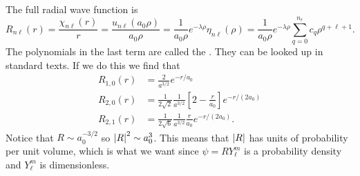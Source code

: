 The full radial wave function is
\[R_{n\ell}(r) = \frac{\chi_{n\ell}(r)}{r} = \frac{u_{n\ell}(a_0\rho)}{a_0\rho} = \frac{1}{a_0\rho}e^{-\lambda\rho}\eta_{n\ell}(\rho) = \frac{1}{a_0\rho}e^{-\lambda\rho}\sum_{q=0}^{n_r} c_q\rho^{q + \ell + 1}.\]
The polynomials in the last term are called the .
They can be looked up in standard texts.
If we do this we find that
\begin{align*}
    R_{1,0}(r) &= \frac{2}{a^{3/2}}e^{-r/a_0}\\
    R_{2,0}(r) &= \frac{1}{2\sqrt{2}} \frac{1}{a^{3/2}} \left[2 - \frac{r}{a_0}\right] e^{-r/(2a_0)}\\
    R_{2,1}(r) &= \frac{1}{2\sqrt{6}} \frac{1}{a^{3/2}} \frac{r}{a_0} e^{-r/(2a_0)}.
\end{align*}
Notice that \(R\sim a_0^{-3/2}\) so \(\abs{R}^2\sim a_0^3\).
This means that \(\abs{R}\) has units of probability per unit volume, which is what we want since \(\psi = RY_\ell^m\) is a probability density and \(Y_\ell^m\) is dimensionless.

